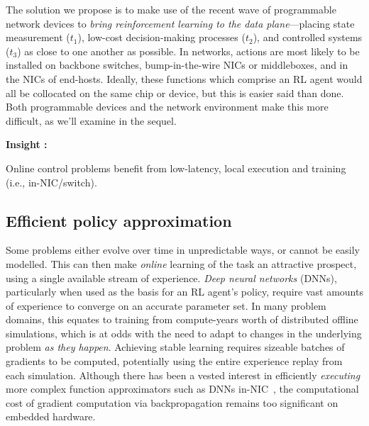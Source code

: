\documentclass[sigconf,natbib=false]{acmart}
\newcounter{insightc}
\newenvironment{insight}
	{
		\begin{tipblock}\refstepcounter{insightc}\textbf{Insight \theinsightc:}\em
	}
	{
		\end{tipblock}
	}
\begin{document}
The solution we propose is to make use of the recent wave of programmable network devices to \emph{bring reinforcement learning to the data plane}---placing state measurement ($t_1$), low-cost decision-making processes ($t_2$), and controlled systems ($t_3$) as close to one another as possible.
In networks, actions are most likely to be installed on backbone switches, bump-in-the-wire NICs or middleboxes, and in the NICs of end-hosts.
Ideally, these functions which comprise an RL agent would all be collocated on the same chip or device, but this is easier said than done. 
Both programmable devices and the network environment make this more difficult, as we'll examine in the sequel.

\begin{insight}
	Online control problems benefit from low-latency, local execution and training (i.e., in-NIC/switch).
\end{insight}

\subsection{Efficient policy approximation}
Some problems either evolve over time in unpredictable ways, or cannot be easily modelled.
This can then make \emph{online} learning of the task an attractive prospect, using a single available stream of experience.
\emph{Deep neural networks} (DNNs), particularly when used as the basis for an RL agent's policy, require vast amounts of experience to converge on an accurate parameter set.
In many problem domains, this equates to training from compute-years worth of distributed offline simulations, which is at odds with the need to adapt to changes in the underlying problem \emph{as they happen}.
Achieving stable learning requires sizeable batches of gradients to be computed, potentially using the entire experience replay from each simulation.
Although there has been a vested interest in efficiently \emph{executing} more complex function approximators such as DNNs in-NIC~\parencite{DBLP:journals/corr/abs-2002-08987,DBLP:journals/corr/abs-2009-02353,DBLP:conf/sigcomm/SanvitoSB18,DBLP:journals/corr/abs-1801-05731,langlet-ml-netronome}, the computational cost of gradient computation via backpropagation remains too significant on embedded hardware.

\end{document}
